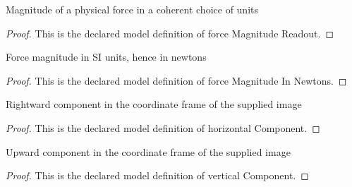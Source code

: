 \begin{definition}
  \label{def:physics:phyx-mini-0756:phyxminiproblems-problemphyxmini0756-forcemagnitudereadout}
  Magnitude of a physical force in a coherent choice of units
\end{definition}
\begin{proof}
  This is the declared model definition of force Magnitude Readout.
\end{proof}
\begin{definition}
  \label{def:physics:phyx-mini-0756:phyxminiproblems-problemphyxmini0756-forcemagnitudeinnewtons}
  Force magnitude in SI units, hence in newtons
\end{definition}
\begin{proof}
  This is the declared model definition of force Magnitude In Newtons.
\end{proof}
\begin{definition}
  \label{def:physics:phyx-mini-0756:phyxminiproblems-problemphyxmini0756-horizontalcomponent}
  Rightward component in the coordinate frame of the supplied image
\end{definition}
\begin{proof}
  This is the declared model definition of horizontal Component.
\end{proof}
\begin{definition}
  \label{def:physics:phyx-mini-0756:phyxminiproblems-problemphyxmini0756-verticalcomponent}
  Upward component in the coordinate frame of the supplied image
\end{definition}
\begin{proof}
  This is the declared model definition of vertical Component.
\end{proof}
